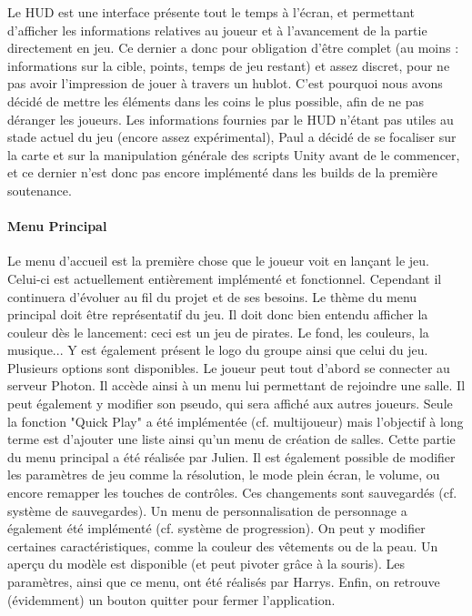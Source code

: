             Le HUD est une interface présente tout le temps à l'écran, et permettant d'afficher 
            les informations relatives au joueur et à l'avancement de la partie directement en jeu. 
            Ce dernier a donc pour obligation d'être complet (au moins : informations sur la cible,
            points, temps de jeu restant) et assez discret, pour ne pas avoir l'impression 
            de jouer à travers un hublot. C'est pourquoi nous avons décidé de mettre les 
            éléments dans les coins le plus possible, afin de ne pas déranger les joueurs.
            Les informations fournies par le HUD n'étant pas utiles au stade actuel du jeu 
            (encore assez expérimental), Paul a décidé de se focaliser sur la carte et sur la manipulation
            générale des scripts Unity avant de le commencer, et ce dernier n'est donc pas 
            encore implémenté dans les builds de la première soutenance.


        \paragraph{Menu Principal}

            Le menu d'accueil est la première chose que le joueur voit en lançant le jeu.
            Celui-ci est actuellement entièrement implémenté et fonctionnel. Cependant il continuera 
            d'évoluer au fil du projet et de ses besoins.
            Le thème du menu principal doit être représentatif du jeu. Il doit donc bien entendu 
            afficher la couleur dès le lancement: ceci est un jeu de pirates.
            Le fond, les couleurs, la musique... Y est également présent le logo du 
            groupe ainsi que celui du jeu.
            Plusieurs options sont disponibles. Le joueur peut tout d'abord se connecter 
            au serveur Photon. Il accède ainsi à un menu lui permettant de rejoindre une 
            salle. Il peut également y modifier son pseudo, qui sera affiché aux autres 
            joueurs. Seule la fonction "Quick Play" a été implémentée (cf. multijoueur) mais 
            l'objectif à long terme est d'ajouter une liste ainsi qu'un menu de création de 
            salles. Cette partie du menu principal a été réalisée par Julien.
            Il est également possible de modifier les paramètres de jeu comme la 
            résolution, le mode plein écran, le volume, ou encore remapper les touches de 
            contrôles. Ces changements sont sauvegardés (cf. système de sauvegardes).
            Un menu de personnalisation de personnage a également été implémenté 
            (cf. système de progression). On peut y modifier certaines caractéristiques, 
            comme la couleur des vêtements ou de la peau. Un aperçu du modèle est disponible 
            (et peut pivoter grâce à la souris). Les paramètres, ainsi que ce menu, ont été 
            réalisés par Harrys.
            Enfin, on retrouve (évidemment) un bouton quitter pour fermer l'application.
            
